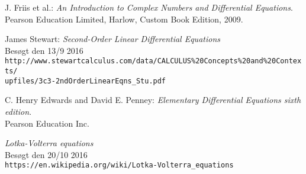 \begin{thebibliography}{10}
J. Friis et al.: 
\textit{An Introduction to Complex Numbers and Differential Equations}. \\
Pearson Education Limited, Harlow, Custom Book Edition, 2009.

James Stewart:
\textit{Second-Order Linear Differential Equations} \\
Besøgt den 13/9 2016\\
\texttt{http://www.stewartcalculus.com/data/CALCULUS\%20Concepts\%20and\%20Contexts/\\upfiles/3c3-2ndOrderLinearEqns\_Stu.pdf}

C. Henry Edwards and David E. Penney: 
\textit{Elementary Differential Equations sixth edition}. \\
Pearson Education Inc.


\textit{Lotka-Volterra equations} \\
Besøgt den 20/10 2016\\
\texttt{https://en.wikipedia.org/wiki/Lotka-Volterra\_equations}
\end{thebibliography}